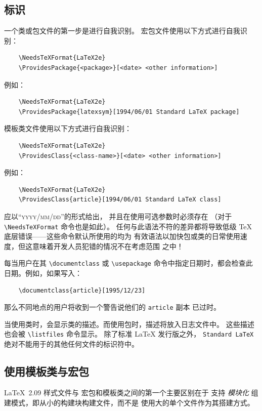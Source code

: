 \documentclass{ltxguide}[1995/11/28]
\begin{document}
\subsection{标识}

一个类或包文件的第一步是进行自我识别。
宏包文件使用以下方式进行自我识别：
\begin{verbatim}
	\NeedsTeXFormat{LaTeX2e}
	\ProvidesPackage{<package>}[<date> <other information>]
\end{verbatim}
例如：
\begin{verbatim}
	\NeedsTeXFormat{LaTeX2e}
	\ProvidesPackage{latexsym}[1994/06/01 Standard LaTeX package]
\end{verbatim}
模板类文件使用以下方式进行自我识别：
\begin{verbatim}
	\NeedsTeXFormat{LaTeX2e}
	\ProvidesClass{<class-name>}[<date> <other information>]
\end{verbatim}
例如：
\begin{verbatim}
	\NeedsTeXFormat{LaTeX2e}
	\ProvidesClass{article}[1994/06/01 Standard LaTeX class]
\end{verbatim}
应以“\textsc{yyyy/mm/dd}”的形式给出，
并且在使用可选参数时必须存在
（对于 \verb|\NeedsTeXFormat| 命令也是如此）。
任何与此语法不符的差异都将导致低级 \TeX{} 底层错误——这些命令默认所使用的均为
有效语法以加快包或类的日常使用速度，但这意味着开发人员犯错的情况不在考虑范围
之中！

每当用户在其 \verb|\documentclass| 或 \verb|\usepackage|
命令中指定日期时，都会检查此日期。例如，如果写入：
\begin{verbatim}
	\documentclass{article}[1995/12/23]
\end{verbatim}
那么不同地点的用户将收到一个警告说他们的 \verb|article| 副本
已过时。

当使用类时，会显示类的描述。而使用包时，描述将放入日志文件中。
这些描述也会被 \verb|\listfiles| 命令显示。
除了标准 \LaTeX{} 发行版之外，
\texttt{Standard LaTeX} 绝对不能用于的其他任何文件的标识符中。

\subsection{使用模板类与宏包}

\LaTeX~2.09 样式文件与 \LaTeXe{} 宏包和模板类之间的第一个主要区别在于
\LaTeXe{} 支持 \emph{模块化} 组建模式，即从小的构建块构建文件，而不是
使用大的单个文件作为其搭建方式。
\end{document}
